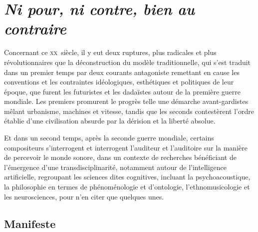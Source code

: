 \documentclass{article}
\begin{document}
%
%

\section{\textit{Ni pour, ni contre, bien au contraire}}

Concernant ce \textsc{xx}\ieme ~siècle, il y eut deux ruptures, plus radicales et plus révolutionnaires que la déconstruction du modèle traditionnelle, %
qui s'est traduit dans un premier temps par deux courants antagoniste remettant en cause les conventions et les contraintes idéologiques, esthétiques et politiques de leur époque, que furent les futuristes %
et les dadaïstes autour de la première guerre mondiale. Les premiers promurent le progrès telle une démarche avant-gardistes mêlant urbanisme, machines et vitesse, tandis que les seconds contestèrent l'ordre établie d'une civilisation absurde par la dérision et la liberté absolue. 

Et dans un second temps, après la seconde guerre mondiale, certains compositeurs s'interrogent et interrogent l'auditeur et l'auditoire sur la manière de percevoir le monde sonore, dans un contexte de recherches bénéficiant de l'émergence d'une transdisciplinarité, notamment autour de l'intelligence artificielle, regroupant les sciences dites cognitives, incluant la psychoacoustique, la philosophie en termes de phénoménologie et d'ontologie, l'ethnomusicologie et les neurosciences, pour n'en citer que quelques unes.

\subsection{Manifeste}
\end{document}
